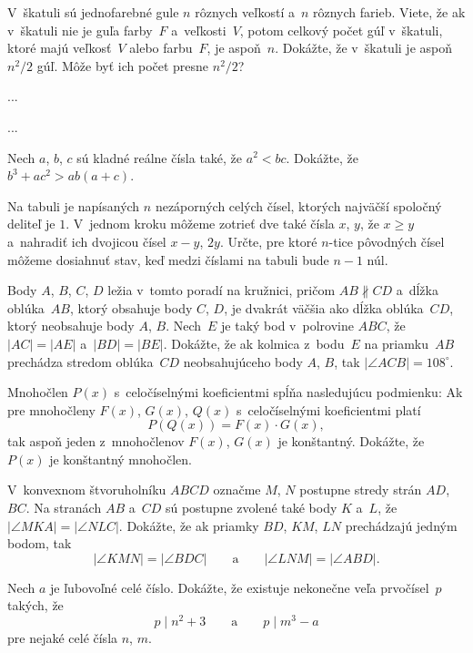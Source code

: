 {%
V~škatuli sú jednofarebné gule $n$ rôznych veľkostí a~$n$ rôznych farieb. Viete, že ak v~škatuli nie je guľa farby~$F$ a~veľkosti~$V$, potom celkový počet gúľ v~škatuli, ktoré majú veľkosť~$V$ alebo farbu~$F$, je aspoň~$n$. Dokážte, že v~škatuli je aspoň $n^2/2$ gúľ. Môže byť ich počet presne $n^2/2$?}

{%
...}

{%
...}

{%
Nech $a$, $b$, $c$ sú kladné reálne čísla také, že $a^2<bc$. Dokážte, že $b^3+ac^2>ab(a+c)$.}

{%
Na tabuli je napísaných $n$ nezáporných celých čísel, ktorých najväčší spoločný deliteľ je $1$. V~jednom kroku môžeme zotrieť dve také čísla $x$, $y$, že $x\ge y$ a~nahradiť ich dvojicou čísel $x-y$, $2y$. Určte, pre ktoré $n$-tice pôvodných čísel môžeme dosiahnuť stav, keď medzi číslami na tabuli bude $n-1$ núl.
}

{%
Body $A$, $B$, $C$, $D$ ležia v~tomto poradí na kružnici, pričom $AB\nparallel CD$ a~dĺžka oblúka~$AB$, ktorý obsahuje body $C$, $D$, je dvakrát väčšia ako dĺžka oblúka~$CD$, ktorý neobsahuje body $A$, $B$. Nech~$E$ je taký bod v~polrovine $ABC$, že $|AC|=|AE|$ a~$|BD|=|BE|$. Dokážte, že ak kolmica z~bodu~$E$ na priamku~$AB$ prechádza stredom oblúka~$CD$ neobsahujúceho body $A$, $B$, tak $|\angle ACB|=108^{\circ}$.}

{%
Mnohočlen $P(x)$ s~celočíselnými koeficientmi spĺňa nasledujúcu podmienku: Ak pre mnohočleny $F(x)$, $G(x)$, $Q(x)$ s~celočíselnými koeficientmi platí
$$P(Q(x)) = F(x) \cdot G(x),$$
tak aspoň jeden z~mnohočlenov $F(x)$, $G(x)$ je konštantný.
Dokážte, že $P(x)$ je konštantný mnohočlen.
}

{%
V~konvexnom štvoruholníku $ABCD$ označme $M$, $N$ postupne stredy strán $AD$, $BC$. Na stranách $AB$ a~$CD$ sú postupne zvolené také body $K$ a~$L$, že $|\angle MKA|=|\angle NLC|$. Dokážte, že ak priamky $BD$, $KM$, $LN$ prechádzajú jedným bodom, tak
$$
|\angle KMN|=|\angle BDC| \qquad \text{a}\qquad |\angle LNM|=|\angle ABD|.
$$
}

{%
Nech $a$ je ľubovoľné celé číslo. Dokážte, že existuje nekonečne veľa prvočísel~$p$ takých, že
$$
p\mid n^2+3 \qquad \text{a} \qquad p\mid m^3-a
$$
pre nejaké celé čísla $n$, $m$.
}


